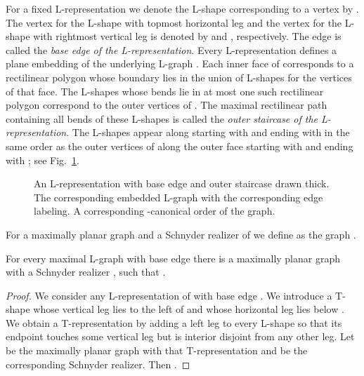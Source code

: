 \documentclass{llncs}
\begin{document}
For a fixed L-representation we denote the L-shape corresponding to a vertex  by . The vertex for the L-shape with topmost horizontal leg and the vertex for the L-shape with rightmost vertical leg is denoted by  and , respectively. The edge  is called the \emph{base edge of the L-representation}. Every L-representation defines a plane embedding of the underlying L-graph . Each inner face of  corresponds to a rectilinear polygon whose boundary lies in the union of L-shapes for the vertices of that face. 
The L-shapes whose bends lie in at most one such rectilinear polygon correspond to the outer vertices of . The maximal rectilinear path  containing all bends of these L-shapes is called the \emph{outer staircase of the L-representation}. The L-shapes appear along  starting with  and ending with  in the same order as the outer vertices of  along the outer face starting with  and ending with ; see Fig.~\ref{fig:example}.



\begin{figure}[t!]
\centering
 \caption{ An L-representation with base edge  and outer staircase  drawn thick.  The corresponding embedded L-graph with the corresponding edge labeling.  A corresponding -canonical order of the graph.}
 \label{fig:example}
\end{figure}

For a maximally planar graph  and a Schnyder realizer  of  we define  as the graph .

\begin{lemma}\label{lem:L-is-2/3-Schnyder}
For every maximal L-graph  with base edge  there is a maximally planar graph  with a Schnyder realizer , such that .
\end{lemma}
\begin{proof}
We consider any L-representation of  with base edge . We introduce a T-shape  whose vertical leg lies to the left of  and whose horizontal leg lies below . We obtain a T-representation by adding a left leg to every L-shape so that its endpoint touches some vertical leg but is interior disjoint from any other leg. Let  be the maximally planar graph with that T-representation and  be the corresponding Schnyder realizer. Then .
\end{proof}
\end{document}
